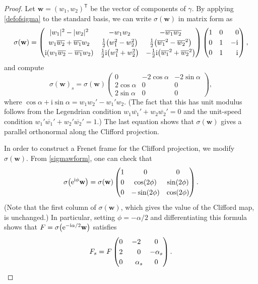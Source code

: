 \documentclass[10pt,a4paper]{amsart}
\def\ri{\mathrm{i}}
\def\gam{\gamma} %
\newcommand\bw{\mathbf w}
\numberwithin{equation}{section}
\begin{document}
\begin{proof} Let $\bw=(w_1, w_2)^{\mathsf{T}}$ be the vector of components of $\gam$. By applying \eqref{defofsigma} to the standard basis, we can write $\sigma(\bw)$ in matrix form as \begin{equation}\label{sigmawform}\renewcommand{\arraystretch}{1.2}
\sigma(\bw) = \begin{pmatrix} |w_1|^2 - |w_2|^2 & -w_1 w_2 & -\overline{w_1} \overline{w_2} \\
w_1\overline{w_2} + \overline{w_1} w_2 & \tfrac12\bigl(w_1^2-w_2^2\bigr) & \tfrac12\bigl(\overline{w_1}^2-\overline{w_2}^2\bigr) \\
\ri (w_1\overline{w_2} - \overline{w_1} w_2) & \tfrac12\ri \bigl(w_1^2+w_2^2\bigr) & -\tfrac12 \ri \bigl(\overline{w_1}^2 + \overline{w_2}^2\bigr)
\end{pmatrix} \begin{pmatrix} 1 & 0 & \hphantom{-}0 \\ 0 & 1 & -\ri \\ 0 & 1 & \hphantom{-}\ri \end{pmatrix},
\end{equation}
and compute
\[
\sigma(\bw)_s = \sigma(\bw) \begin{pmatrix} 0 & -2\cos \alpha & -2\sin\alpha \\ 2\cos\alpha & 0 & 0\\ 2\sin\alpha & 0 & 0\end{pmatrix},
\]
where $\cos \alpha + \ri \sin \alpha = w_1 w_2' - w_1' w_2$. (The fact that this has unit modulus follows from the Legendrian condition $w_1\overline{w_1}'+w_2 \overline{w_2}'=0$ and the unit-speed condition $w_1'\overline{w_1}'+w_2' \overline{w_2}'=1$.)
The last equation shows that $\sigma(\mathbf w)$ gives a parallel orthonormal along the Clifford projection.

In order to construct a Frenet frame for the Clifford projection, we modify $\sigma(\bw)$. From \eqref{sigmawform}, one can check that
\begin{equation*}%
\sigma\bigl({\rm e}^{\ri \phi} \bw\bigr) = \sigma(\bw) \begin{pmatrix} 1 & 0 & 0 \\ 0 & \cos(2\phi) & \sin(2\phi) \\ 0 & -\sin(2\phi) & \cos(2\phi) \end{pmatrix}.
\end{equation*}
(Note that the first column of $\sigma(\bw)$, which gives the value of the Clifford map, is unchanged.)
In particular, setting $\phi = -\alpha/2$ and differentiating this formula shows that $F= \sigma\bigl({\rm e}^{-\ri \alpha/2} \bw\bigr)$ satisfies
\[F_s = F \begin{pmatrix} 0 & -2 & 0 \\ 2 & \hphantom{-}0 & -\alpha_s \\ 0 & \hphantom{-}\alpha_s & 0 \end{pmatrix}.\]


\end{proof}
\end{document}
